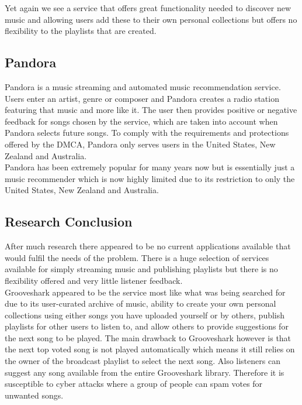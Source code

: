 \documentclass[a4paper, 12pt]{report}
\begin{document}
Yet again we see a service that offers great functionality needed to discover new music and allowing users add these to their own personal collections but offers no flexibility to the playlists that are created. 

\subsection{Pandora}
Pandora\cite{pandora} is a music streaming and automated music recommendation service. Users enter an artist, genre or composer and Pandora creates a radio station featuring that music and more like it. The user then provides positive or negative feedback for songs chosen by the service, which are taken into account when Pandora selects future songs. To comply with the requirements and protections offered by the DMCA, Pandora only serves users in the United States, New Zealand and Australia. \\

Pandora has been extremely popular for many years now but is essentially just a music recommender which is now highly limited due to its restriction to only the United States, New Zealand and Australia. 

\subsection{Research Conclusion}
After much research there appeared to be no current applications available that would fulfil the needs of the problem. There is a huge selection of services available for simply streaming music and publishing playlists but there is no flexibility offered and very little listener feedback.\\

Grooveshark appeared to be the service most like what was being searched for due to its user-curated archive of music, ability to create your own personal collections using either songs you have uploaded yourself or by others, publish playlists for other users to listen to, and allow others to provide suggestions for the next song to be played. 
The main drawback to Grooveshark however is that the next top voted song is not played automatically which means it still relies on the owner of the broadcast playlist to select the next song. Also listeners can suggest any song available from the entire Grooveshark library. Therefore it is susceptible to cyber attacks where a group of people can spam votes for unwanted songs.

\clearpage
\end{document}

